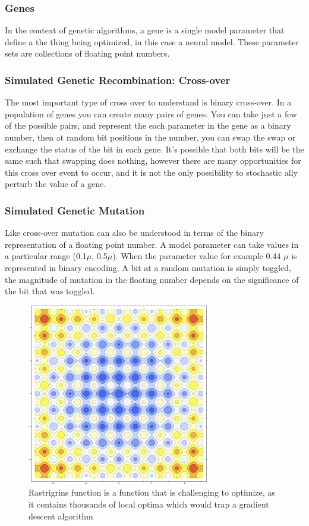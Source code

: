 \subsubsection{Genes}
In the context of genetic algorithms, a gene is a single model parameter that define a the thing being optimized, in this case a neural model. These parameter sets are collections of floating point numbers.

\subsubsection{Simulated Genetic Recombination: Cross-over}
The most important type of cross over to understand is binary cross-over. In a population of genes you can create many pairs of genes. You can take just a few of the possible pairs, and represent the each parameter in the gene as a binary number, then at random bit positions in the number, you can swap the swap or exchange the status of the bit in each gene. It's possible that both bits will be the same such that swapping does nothing, however there are many opportunities for this cross over event to occur, and it is not the only possibility to stochastic ally perturb the value of a gene.
\subsubsection{Simulated Genetic Mutation}
Like cross-over mutation can also be understood in terms of the binary representation of a floating point number. A model parameter can take values in a particular range (0.1$\mu$, 0.5$\mu$). When the parameter value for example $0.44$ $\mu$ is represented in binary encoding. A bit at a random mutation is simply toggled, the magnitude of mutation in the floating number depends on the significance of the bit that was toggled.\\

\begin{center}
\begin{figure}
\includegraphics[]{figures/rastagrind}
\caption{Rastrigrins function is a function that is challenging to optimize, as it contains thousands of local optima which would trap a gradient descent algorithm}
\end{figure}
\end{center}


